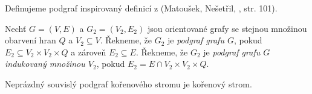 Definujeme podgraf inspirovaný definicí z (Matoušek, Nešetřil, \cite{matouvsek2009kapitoly}, str. 101).
\begin{definice}[Podgraf]
    Nechť $G = (V,E)$ a $G_2 = (V_2, E_2)$ jsou orientované grafy se stejnou množinou obarvení hran $Q$ a $V_2 \subseteq V$. Řekneme, že $G_2$ je \emph{podgraf grafu $G$}, pokud $E_2 \subseteq V_2 \times V_2 \times Q$ a zároveň $E_2 \subseteq E$.
    Řekneme, že $G_2$ je \emph{podgraf grafu $G$ indukovaný množinou $V_2$}, pokud $E_2 =  E \cap V_2\times V_2 \times Q$.
\end{definice}

\begin{tvrz}\label{tvrzeni-podgraf-korenoveho-stromu}
    Neprázdný souvislý podgraf kořenového stromu je kořenový strom.
\end{tvrz}
